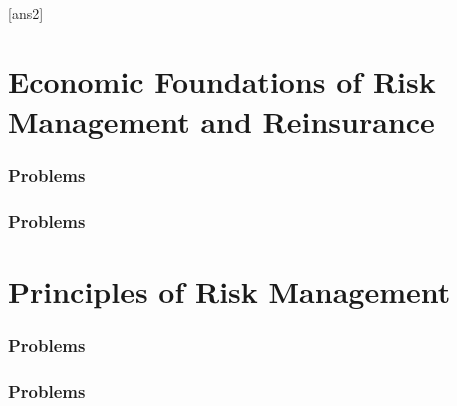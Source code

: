 \documentclass[justified,marginals=raggedright,notoc]{tufte-book}
\begin{document}

~\vfill
\begin{doublespace}
\noindent\fontsize{18}{22}\selectfont\itshape
\nohyphenation
\end{doublespace}
\vfill
\vfill


\cleardoublepage



 

[ans2]


\setcounter{page}{1}


\mainmatter

\part{Economic Foundations of Risk Management and Reinsurance}

\section{Problems}


\section{Problems}



\part{Principles of Risk Management}

\section{Problems}

 
\section{Problems}


\end{document}
